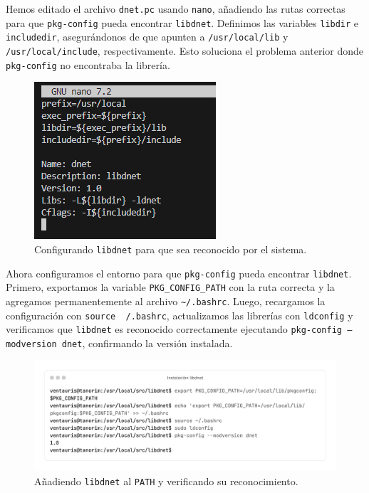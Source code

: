\documentclass[11pt,a4paper,twoside]{report}
\begin{document}
\newpage

Hemos editado el archivo \texttt{dnet.pc} usando \texttt{nano}, añadiendo las rutas correctas para que \texttt{pkg-config} pueda encontrar \texttt{libdnet}. Definimos las variables \texttt{libdir} e \texttt{includedir}, asegurándonos de que apunten a \texttt{/usr/local/lib} y \texttt{/usr/local/include}, respectivamente. Esto soluciona el problema anterior donde \texttt{pkg-config} no encontraba la librería.

\begin{figure}[H]
	\centering
	\includegraphics[scale=1]{instalacion_snort/7.png}
	\caption{Configurando \texttt{libdnet} para que sea reconocido por el sistema.}
\end{figure}

Ahora configuramos el entorno para que \texttt{pkg-config} pueda encontrar \texttt{libdnet}. Primero, exportamos la variable \texttt{PKG\_CONFIG\_PATH} con la ruta correcta y la agregamos permanentemente al archivo \texttt{\~{}/.bashrc}. Luego, recargamos la configuración con \texttt{source ~/.bashrc}, actualizamos las librerías con \texttt{ldconfig} y verificamos que \texttt{libdnet} es reconocido correctamente ejecutando \texttt{pkg-config --modversion dnet}, confirmando la versión instalada.

\begin{figure}[H]
	\centering
	\includegraphics[scale=0.12]{instalacion_snort/8-8.png}
	\caption{Añadiendo \texttt{libdnet} al \texttt{PATH} y verificando su reconocimiento.}
\end{figure}
\end{document}
